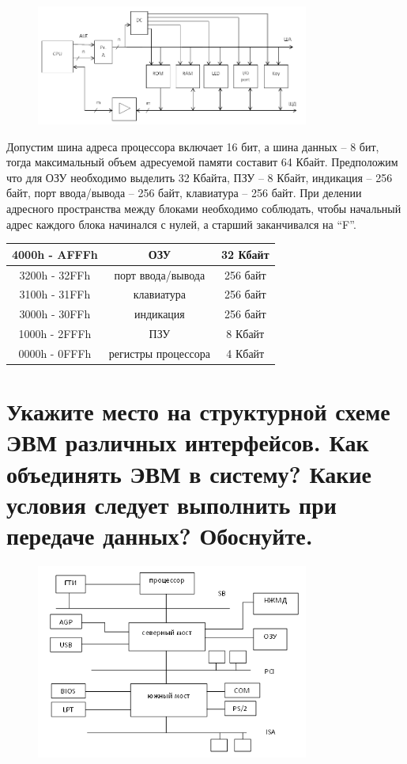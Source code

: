 \documentclass[unicode, 12pt, a4paper, oneside]{article}
\begin{document}
\begin{figure}[H]
\centering
\includegraphics[width=0.8\textwidth]{101_struct.png}
\end{figure}

Допустим шина адреса процессора включает 16 бит, а шина данных – 8 бит, тогда максимальный объем адресуемой памяти составит 64 Кбайт. Предположим что для ОЗУ необходимо выделить 32 Кбайта, ПЗУ – 8 Кбайт, индикация – 256 байт, порт ввода/вывода – 256 байт, клавиатура – 256 байт. При делении адресного пространства между блоками необходимо соблюдать, чтобы начальный адрес каждого блока начинался с нулей, а старший заканчивался на “F”.

\begin{center}
\begin{tabular}{|c|c|c|}
\hline 4000h - AFFFh & ОЗУ                 &  32 Кбайт  \\
\hline 3200h - 32FFh & порт ввода/вывода   &  256 байт  \\
\hline 3100h - 31FFh & клавиатура          & 256 байт   \\
\hline 3000h - 30FFh & индикация           & 256 байт   \\
\hline 1000h - 2FFFh & ПЗУ                 &  8 Кбайт   \\
\hline 0000h - 0FFFh & регистры процессора & 4 Кбайт    \\
\hline
\end{tabular}
\end{center} 

\section{Укажите место на структурной схеме ЭВМ различных интерфейсов. Как объединять ЭВМ в  систему? Какие условия следует выполнить при  передаче данных? Обоснуйте.}
\begin{figure}[H]
\centering
\includegraphics[width=0.8\textwidth]{./images/102_interface.png}
\end{figure}
\end{document}
